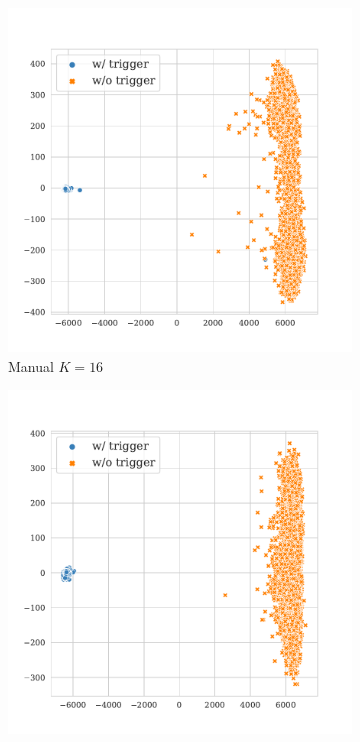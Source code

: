 \begin{figure}[!ht]
\begin{subfigure}{.33\textwidth}
  \centering
  \includegraphics[width=\linewidth]{figures/evaluation_media/sst2-roberta-large-visual-backdoor-manual-prompt-k16-seed42-poison-cf-1045.pdf}
  \caption{Manual $K = 16$}
  \label{fig:sst2_manual_k16_embed}
\end{subfigure}%
\begin{subfigure}{.33\textwidth}
  \centering
  \includegraphics[width=\linewidth]{figures/evaluation_media/sst2-roberta-large-visual-backdoor-auto-k16-seed42-candidates10-poison-cf-1114.pdf}

\end{subfigure}
\end{figure}
